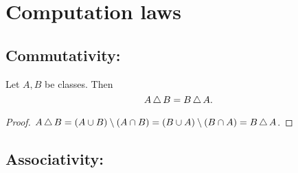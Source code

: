 \documentclass[../../set-theory/set-theory.tex]{subfiles}
\begin{document}
  \section{Computation laws}

  \subsection*{Commutativity:}

  \begin{forthel}
    \begin{proposition}
      Let $A, B$ be classes.
      Then \[ A \mathop{\triangle} B = B \mathop{\triangle} A. \]
    \end{proposition}
    \begin{proof}
      $A \mathop{\triangle} B =
      (A \cup B) \setminus (A \cap B) =
      (B \cup A) \setminus (B \cap A) =
      B \mathop{\triangle} A$.
    \end{proof}
  \end{forthel}


  \subsection*{Associativity:}
\end{document}

